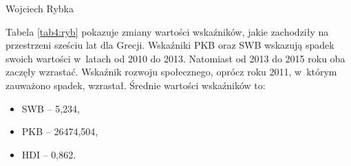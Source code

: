 \begin{artplenv}{Wojciech Rybka}
%

Tabela \ref{tab4:ryb} pokazuje zmiany wartości wskaźników, jakie zachodziły na przestrzeni sześciu lat dla Grecji. Wskaźniki PKB oraz
SWB wskazują spadek swoich wartości w~latach od 2010 do 2013. Natomiast od 2013 do 2015 roku oba zaczęły wzrastać.
Wskaźnik rozwoju społecznego, oprócz roku 2011, w~którym zauważono spadek, wzrastał. Średnie wartości wskaźników to:

\begin{itemize}
\item SWB -- 5,234,
\item PKB -- 26474,504,
\item HDI -- 0,862.
\end{itemize}



\end{artplenv}
